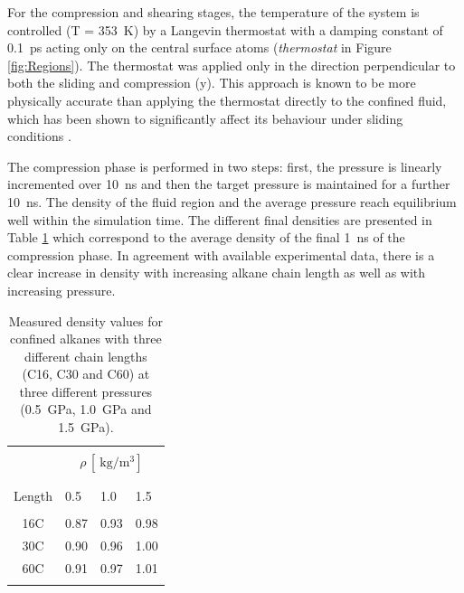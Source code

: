\documentclass[aps,prb,reprint,superscriptaddress, a4paper]{revtex4-1}
\begin{document}
For the compression and shearing stages, the temperature of the system is controlled (T = \SI{353}{\kelvin}) by a Langevin thermostat \cite{Schneider1978} with a damping constant of \SI{0.1}{\pico\second} acting only on the central surface atoms (\textit{thermostat} in Figure \ref{fig:Regions}). The thermostat was applied only in the direction perpendicular to both the sliding and compression (y). This approach is known to be more physically accurate than applying the thermostat directly to the confined fluid, which has been shown to significantly affect its behaviour under sliding conditions \cite{Liem1992,Bernardi2010,Yong2013}.

The compression phase is performed in two steps: first, the pressure is linearly incremented over \SI{10}{\nano\second} and then the target pressure is maintained for a further \SI{10}{\nano\second}. The density of the fluid region and the average pressure reach equilibrium well within the simulation time. The different final densities are presented in Table \ref{tab:rho} which correspond to the average density of the final \SI{1}{\nano\second} of the compression phase. In agreement with available experimental data\cite{Griesbaum2000}, there is a clear increase in density with increasing alkane chain length as well as with increasing pressure.

\begin{table}
	\caption{Measured density values for confined alkanes  with three different chain lengths (C16, C30 and C60) at three different pressures (\SI{0.5}{\giga\pascal}, \SI{1.0}{\giga\pascal} and \SI{1.5}{\giga\pascal}).}   
	\centering     
	\begin{tabular}{c | l l  l}
		\hline\hline\\ [-2ex]

		
										&	\multicolumn{3}{c}{ $\rho \, [\SI{}{\kilogram\per\cubic\meter}]$} \\

		\hline\\ [-2ex]
		\backslashbox{Chain \\ Length}{P $[\SI{}{\giga\pascal}]$}	&	0.5		&	1.0		&	1.5	\\

		\hline\\ [-2ex]
		16C								&	0.87	&	0.93	&	0.98	\\
		30C								&	0.90	&	0.96	&	1.00	\\	
		60C								&	0.91	&	0.97	&	1.01	\\	

		\hline\hline    \\[-2ex]
	\end{tabular}
	\label{tab:rho}  
\end{table}
\end{document}
